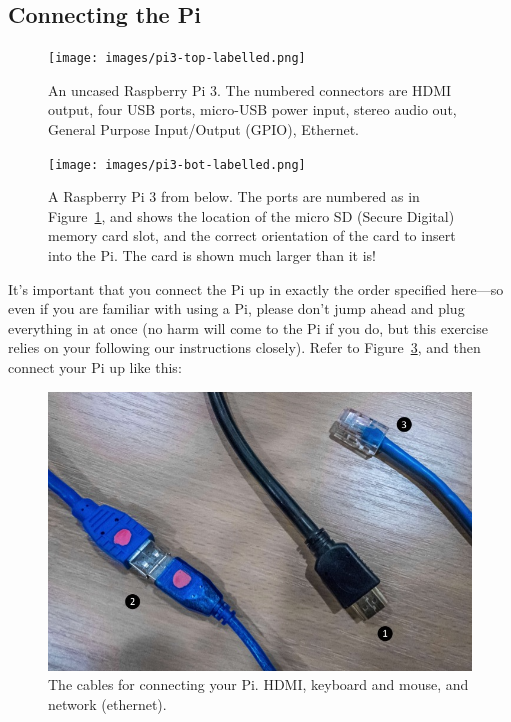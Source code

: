 \subsection{Connecting the Pi}
\label{sec:connecting-pi}

\begin{figure}
\centerline{\texttt{[image: images/pi3-top-labelled.png]}}
\caption{An uncased Raspberry Pi 3. The numbered connectors are \protect{} HDMI output,  \protect{} four USB ports,  \protect{} micro-USB power input,  \protect{} stereo audio out,  \protect{} General Purpose Input/Output (GPIO),  \protect{} Ethernet.}\label{figure:bare-rpi}
\end{figure}

\begin{figure}
\centerline{\texttt{[image: images/pi3-bot-labelled.png]}}
\caption{A Raspberry Pi 3 from below. The ports are numbered as in Figure~\ref{figure:bare-rpi}, and \protect{} shows the location of the micro SD (Secure Digital) memory card slot, and the correct orientation of the card to insert into the Pi. The card is shown much larger than it is!}\label{figure:bare-rpi-underside}
\end{figure}

It's important that you connect the Pi up in exactly the order specified here---so even if you are familiar with using a Pi, please don't jump ahead and plug everything in at once (no harm will come to the Pi if you do, but this exercise relies on your following our instructions closely). Refer to Figure~\ref{figure:cables}, and then connect your Pi up like this:

\begin{figure}
\centerline{\includegraphics[width=13cm]{images/cablesAY17}}
\caption{The cables for connecting your Pi. \protect{} HDMI, \protect{} keyboard and mouse, and \protect{} network (ethernet).}\label{figure:cables}
\end{figure}

